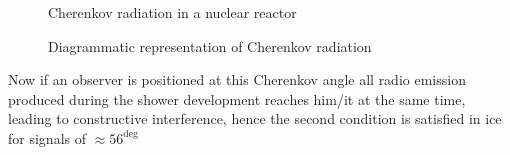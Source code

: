 \documentclass[11pt,a4paper,faculty=we,language=en,doctype=report]{cls/ugent-doc}
\begin{document}
\begin{figure}
\centering
\begin{minipage}{0.45\textwidth}
	\centering
	\caption{Cherenkov radiation in a nuclear reactor}
	\label{figure: Cherenkov reactor}
\end{minipage}
\hspace{0.05\textwidth}
\begin{minipage}{0.45\textwidth}
	\centering
	\caption{Diagrammatic representation of Cherenkov radiation}
	\label{figure: Cherenkov illustratie}
\end{minipage}
\end{figure}
Now if an observer is positioned at this Cherenkov angle all radio emission produced during the shower development reaches him/it at the same time, leading to constructive interference, hence the second condition is satisfied in ice for signals of $\approx 56^\deg$
\end{document}
